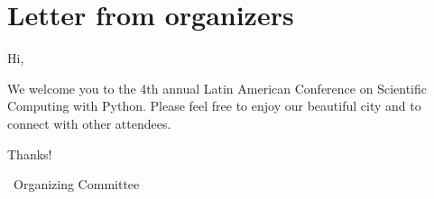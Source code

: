 \section*{Letter from organizers}

Hi,

We welcome you to the 4th annual Latin American Conference on Scientific Computing with Python. Please feel free to enjoy our beautiful city and to connect with other attendees. 

Thanks!

\textemdash\ Organizing Committee
